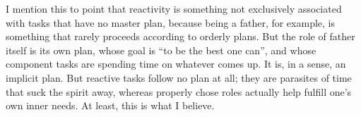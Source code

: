 \documentclass[12pt,a4paper,onecolumn]{article}
\begin{document}
\begin{sffamily}
I mention this to point that reactivity is something not exclusively associated with tasks that have
no master plan, because being a father, for example, is something that rarely proceeds according to
orderly plans. But the role of father itself is its own plan, whose goal is ``to be the best one
can'', and whose component tasks are spending time on whatever comes up. It is, in a sense, an
implicit plan. But reactive tasks follow no plan at all; they are parasites of time that suck the
spirit away, whereas properly chose roles actually help fulfill one's own inner needs. At least,
this is what I believe.

\end{sffamily}
\end{document}
